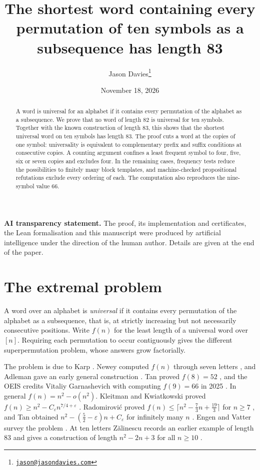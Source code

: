 \documentclass[11pt]{article}
\title{The shortest word containing every permutation of ten symbols as a subsequence has length 83}
\author{Jason Davies\thanks{\href{mailto:jason@jasondavies.com}{\nolinkurl{jason@jasondavies.com}}}}
\date{November 18, 2026}
\begin{document}
\maketitle
\begin{abstract}
A word is universal for an alphabet if it contains every permutation of the alphabet as a subsequence. We prove that no word of length 82 is universal for ten symbols. Together with the known construction of length 83, this shows that the shortest universal word on ten symbols has length 83. The proof cuts a word at the copies of one symbol: universality is equivalent to complementary prefix and suffix conditions at consecutive copies. A counting argument confines a least frequent symbol to four, five, six or seven copies and excludes four. In the remaining cases, frequency tests reduce the possibilities to finitely many block templates, and machine-checked propositional refutations exclude every ordering of each. The computation also reproduces the nine-symbol value 66.
\end{abstract}

\noindent\textbf{AI transparency statement.} The proof, its implementation and certificates, the Lean formalisation and this manuscript were produced by artificial intelligence under the direction of the human author. Details are given at the end of the paper.

\section{The extremal problem}
A word over an alphabet is \emph{universal} if it contains every permutation of the alphabet as a subsequence, that is, at strictly increasing but not necessarily consecutive positions. Write $f(n)$ for the least length of a universal word over $[n]$. Requiring each permutation to occur contiguously gives the different superpermutation problem, whose answers grow factorially.

The problem is due to Karp \cite[Problem~36]{ckk}. Newey computed $f(n)$ through seven letters \cite{newey}, and Adleman gave an early general construction \cite{adleman}. Tan proved $f(8)=52$ \cite{tan}, and the OEIS credits Vitaliy Garnashevich with computing $f(9)=66$ in 2025 \cite{oeis,garnashevich}. In general $f(n)=n^2-o(n^2)$. Kleitman and Kwiatkowski proved $f(n)\ge n^2-C_\varepsilon n^{7/4+\varepsilon}$ \cite{kk}. Radomirovi\'c proved $f(n)\le\lceil n^2-\tfrac73n+\tfrac{19}3\rceil$ for $n\ge7$ \cite{radomirovic}, and Tan obtained $n^2-(\tfrac52-\varepsilon)n+C_\varepsilon$ for infinitely many $n$ \cite{tan2022}. Engen and Vatter survey the problem \cite{engenvatter}. At ten letters Z\u{a}linescu records an earlier example of length 83 and gives a construction of length $n^2-2n+3$ for all $n\ge10$ \cite{zalinescu}.
\end{document}
